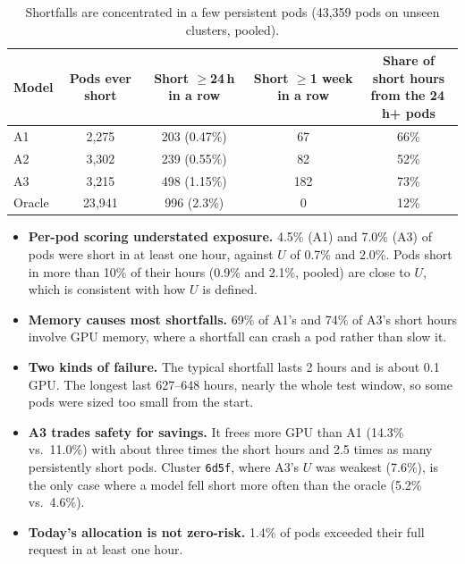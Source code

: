 \begin{table}[H]
\centering\small
\caption{Shortfalls are concentrated in a few persistent pods (43{,}359 pods on unseen clusters, pooled).}
\label{tab:persist}
\begin{tabular}{@{}lcccc@{}}
\toprule
Model & Pods ever short & \makecell{Short $\ge$24\,h\\in a row} & \makecell{Short $\ge$1 week\\in a row} & \makecell{Share of short hours\\from the 24\,h+ pods} \\
\midrule
A1 & 2{,}275 & 203 (0.47\%) & 67 & 66\% \\
A2 & 3{,}302 & 239 (0.55\%) & 82 & 52\% \\
A3 & 3{,}215 & 498 (1.15\%) & 182 & 73\% \\
Oracle & 23{,}941 & 996 (2.3\%) & 0 & 12\% \\
\bottomrule
\end{tabular}
\end{table}

\begin{itemize}
  \item \textbf{Per-pod scoring understated exposure.} 4.5\% (A1) and 7.0\% (A3) of pods were short in at least one hour, against $U$ of 0.7\% and 2.0\%. Pods short in more than 10\% of their hours (0.9\% and 2.1\%, pooled) are close to $U$, which is consistent with how $U$ is defined.
  \item \textbf{Memory causes most shortfalls.} 69\% of A1's and 74\% of A3's short hours involve GPU memory, where a shortfall can crash a pod rather than slow it.
  \item \textbf{Two kinds of failure.} The typical shortfall lasts 2 hours and is about 0.1 GPU. The longest last 627--648 hours, nearly the whole test window, so some pods were sized too small from the start.
  \item \textbf{A3 trades safety for savings.} It frees more GPU than A1 (14.3\% vs.\ 11.0\%) with about three times the short hours and 2.5 times as many persistently short pods. Cluster \texttt{6d5f}, where A3's $U$ was weakest (7.6\%), is the only case where a model fell short more often than the oracle (5.2\% vs.\ 4.6\%).
  \item \textbf{Today's allocation is not zero-risk.} 1.4\% of pods exceeded their full request in at least one hour.
\end{itemize}

